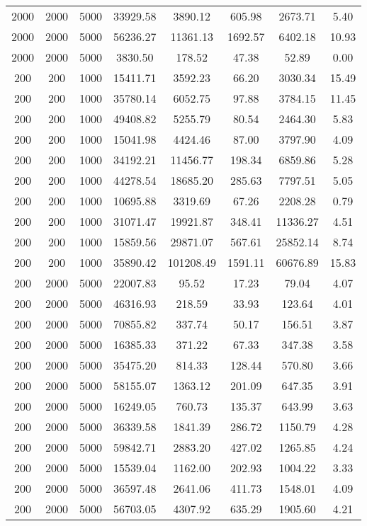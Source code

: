 \documentclass[conference]{IEEEtran}
\begin{document}
\begin{table*}
\begin{center}
\begin{tabular}{|c|c|c|c|c|c|c|c|}
2000 & 2000 & 5000 & 33929.58 & 3890.12 & 605.98 & 2673.71 & 5.40 \\
2000 & 2000 & 5000 & 56236.27 & 11361.13 & 1692.57 & 6402.18 & 10.93 \\
2000 & 2000 & 5000 & 3830.50 & 178.52 & 47.38 & 52.89 & 0.00 \\
200 & 200 & 1000 & 15411.71 & 3592.23 & 66.20 & 3030.34 & 15.49 \\
200 & 200 & 1000 & 35780.14 & 6052.75 & 97.88 & 3784.15 & 11.45 \\
200 & 200 & 1000 & 49408.82 & 5255.79 & 80.54 & 2464.30 & 5.83 \\
200 & 200 & 1000 & 15041.98 & 4424.46 & 87.00 & 3797.90 & 4.09 \\
200 & 200 & 1000 & 34192.21 & 11456.77 & 198.34 & 6859.86 & 5.28 \\
200 & 200 & 1000 & 44278.54 & 18685.20 & 285.63 & 7797.51 & 5.05 \\
200 & 200 & 1000 & 10695.88 & 3319.69 & 67.26 & 2208.28 & 0.79 \\
200 & 200 & 1000 & 31071.47 & 19921.87 & 348.41 & 11336.27 & 4.51 \\
200 & 200 & 1000 & 15859.56 & 29871.07 & 567.61 & 25852.14 & 8.74 \\
200 & 200 & 1000 & 35890.42 & 101208.49 & 1591.11 & 60676.89 & 15.83 \\
200 & 2000 & 5000 & 22007.83 & 95.52 & 17.23 & 79.04 & 4.07 \\
200 & 2000 & 5000 & 46316.93 & 218.59 & 33.93 & 123.64 & 4.01 \\
200 & 2000 & 5000 & 70855.82 & 337.74 & 50.17 & 156.51 & 3.87 \\
200 & 2000 & 5000 & 16385.33 & 371.22 & 67.33 & 347.38 & 3.58 \\
200 & 2000 & 5000 & 35475.20 & 814.33 & 128.44 & 570.80 & 3.66 \\
200 & 2000 & 5000 & 58155.07 & 1363.12 & 201.09 & 647.35 & 3.91 \\
200 & 2000 & 5000 & 16249.05 & 760.73 & 135.37 & 643.99 & 3.63 \\
200 & 2000 & 5000 & 36339.58 & 1841.39 & 286.72 & 1150.79 & 4.28 \\
200 & 2000 & 5000 & 59842.71 & 2883.20 & 427.02 & 1265.85 & 4.24 \\
200 & 2000 & 5000 & 15539.04 & 1162.00 & 202.93 & 1004.22 & 3.33 \\
200 & 2000 & 5000 & 36597.48 & 2641.06 & 411.73 & 1548.01 & 4.09 \\
200 & 2000 & 5000 & 56703.05 & 4307.92 & 635.29 & 1905.60 & 4.21 \\

\end{tabular}
\end{center}
\end{table*}
\end{document}
